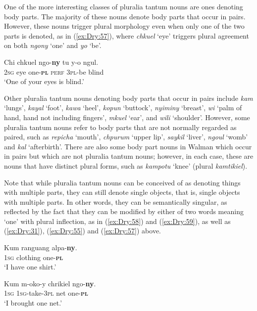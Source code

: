 \documentclass[output=collectionpaper]{langsci/langscibook}
\begin{document}
One of the more interesting classes of pluralia tantum nouns are ones denoting body parts. The majority of these nouns denote body parts that occur in pairs. However, these nouns trigger plural morphology even when only one of the two parts is denoted, as in (\ref{ex:Dry:57}), where \textit{chkuel} `eye' triggers plural agreement on both \textit{ngony} `one' and \textit{yo} `be'.

\ea  \label{ex:Dry:57}
\gll Chi	chkuel	ngo-\textbf{ny}	tu	y-o	ngul.\\
\textsc{2sg} eye one-\textbf{\textsc{pl}} \textsc{perf} \textsc{3pl}-be blind\\
\glt `One of your eyes is blind.'
\z

Other pluralia tantum nouns denoting body parts that occur in pairs include \textit{kam} `lungs', \textit{kayal} `foot', \textit{kawa} `heel', \textit{kopun} `buttock', \textit{nyiminy} `breast', \textit{wi} `palm of hand, hand not including fingers', \textit{mkuel} `ear', and \textit{wili} `shoulder'. However, some pluralia tantum nouns refer to body parts that are not normally regarded as paired, such as \textit{repicha} `mouth', \textit{chpurum} `upper lip', \textit{saykil} `liver', \textit{ngoul} `womb' and \textit{kal} `afterbirth'. There are also some body part nouns in Walman which occur in pairs but which are not pluralia tantum nouns; however, in each case, these are nouns that have distinct plural forms, such as \textit{kampotu} `knee' (plural \textit{kamtikiel}).

Note that while pluralia tantum nouns can be conceived of as denoting things with multiple parts, they can still denote single objects, that is, single objects with multiple parts. In other words, they can be semantically singular, as reflected by the fact that they can be modified by either of two words meaning `one' with plural inflection, as in (\ref{ex:Dry:58}) and (\ref{ex:Dry:59}), as well as (\ref{ex:Dry:31}), (\ref{ex:Dry:55}) and (\ref{ex:Dry:57}) above.

\ea \label{ex:Dry:58}
\gll Kum	ranguang	alpa-\textbf{ny}.\\
\textsc{1sg} clothing one-\textbf{\textsc{pl}}\\
\glt `I have one shirt.'
\z

\ea \label{ex:Dry:59}
\gll Kum	m-oko-y	chrikiel	ngo-\textbf{ny}.\\
\textsc{1sg} \textsc{1sg}-take-\textsc{3pl} net one-\textbf{\textsc{pl}}\\
\glt `I brought one net.'
\z
\end{document}

